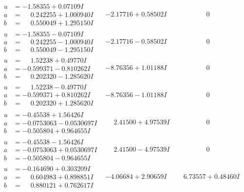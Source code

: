 \documentclass[1p]{elsarticle_modified}
\theoremstyle{definition}
\begin{document}
$$\begin{array}{c|c|c}
\begin{aligned}
u &= -1.58355 + 0.07109 I \\
a &= \phantom{-}0.242255 + 1.000940 I \\
b &= \phantom{-}0.550049 + 1.295150 I\end{aligned}
 & -2.17716 + 0.58502 I & \phantom{-0.000000 } 0 \\ \hline\begin{aligned}
u &= -1.58355 - 0.07109 I \\
a &= \phantom{-}0.242255 - 1.000940 I \\
b &= \phantom{-}0.550049 - 1.295150 I\end{aligned}
 & -2.17716 - 0.58502 I & \phantom{-0.000000 } 0 \\ \hline\begin{aligned}
u &= \phantom{-}1.52238 + 0.49770 I \\
a &= -0.599371 - 0.810262 I \\
b &= \phantom{-}0.202320 - 1.285620 I\end{aligned}
 & -8.76356 + 1.01188 I & \phantom{-0.000000 } 0 \\ \hline\begin{aligned}
u &= \phantom{-}1.52238 - 0.49770 I \\
a &= -0.599371 + 0.810262 I \\
b &= \phantom{-}0.202320 + 1.285620 I\end{aligned}
 & -8.76356 - 1.01188 I & \phantom{-0.000000 } 0 \\ \hline\begin{aligned}
u &= -0.45538 + 1.56426 I \\
a &= -0.0753063 - 0.0530697 I \\
b &= -0.505804 + 0.964655 I\end{aligned}
 & \phantom{-}2.41500 + 4.97539 I & \phantom{-0.000000 } 0 \\ \hline\begin{aligned}
u &= -0.45538 - 1.56426 I \\
a &= -0.0753063 + 0.0530697 I \\
b &= -0.505804 - 0.964655 I\end{aligned}
 & \phantom{-}2.41500 - 4.97539 I & \phantom{-0.000000 } 0 \\ \hline\begin{aligned}
u &= -0.164690 + 0.303209 I \\
a &= \phantom{-}0.604983 + 0.898851 I \\
b &= \phantom{-}0.880121 + 0.762617 I\end{aligned}
 & -4.06684 + 2.90659 I & \phantom{-}6.73557 + 0.48460 I \\ \hline\begin{aligned}

\end{aligned}
\end{array}$$
\end{document}
